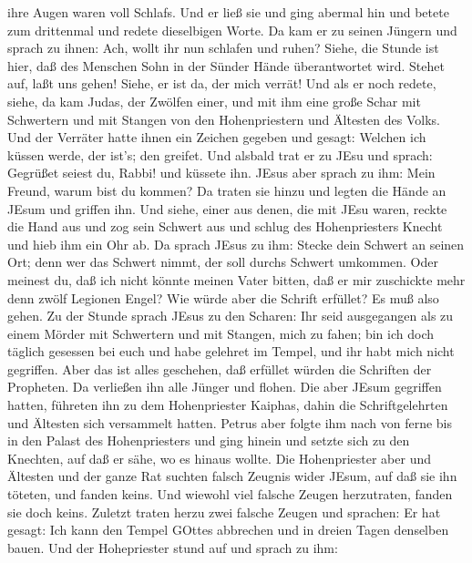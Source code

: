 ihre Augen waren voll Schlafs.  Und er ließ sie und ging
abermal hin und betete zum drittenmal und redete dieselbigen Worte.
 Da kam er zu seinen Jüngern und sprach zu ihnen: Ach,
wollt ihr nun schlafen und ruhen? Siehe, die Stunde ist hier, daß des
Menschen Sohn in der Sünder Hände überantwortet wird. 
Stehet auf, laßt uns gehen! Siehe, er ist da, der mich verrät!
 Und als er noch redete, siehe, da kam Judas, der Zwölfen
einer, und mit ihm eine große Schar mit Schwertern und mit Stangen von
den Hohenpriestern und Ältesten des Volks.  Und der
Verräter hatte ihnen ein Zeichen gegeben und gesagt: Welchen ich küssen
werde, der ist's; den greifet.  Und alsbald trat er zu JEsu
und sprach: Gegrüßet seiest du, Rabbi! und küssete ihn. 
JEsus aber sprach zu ihm: Mein Freund, warum bist du kommen? Da traten
sie hinzu und legten die Hände an JEsum und griffen ihn. 
Und siehe, einer aus denen, die mit JEsu waren, reckte die Hand aus und
zog sein Schwert aus und schlug des Hohenpriesters Knecht und hieb ihm
ein Ohr ab.  Da sprach JEsus zu ihm: Stecke dein Schwert an
seinen Ort; denn wer das Schwert nimmt, der soll durchs Schwert
umkommen.  Oder meinest du, daß ich nicht könnte meinen
Vater bitten, daß er mir zuschickte mehr denn zwölf Legionen Engel?
 Wie würde aber die Schrift erfüllet? Es muß also gehen.
 Zu der Stunde sprach JEsus zu den Scharen: Ihr seid
ausgegangen als zu einem Mörder mit Schwertern und mit Stangen, mich zu
fahen; bin ich doch täglich gesessen bei euch und habe gelehret im
Tempel, und ihr habt mich nicht gegriffen.  Aber das ist
alles geschehen, daß erfüllet würden die Schriften der Propheten. Da
verließen ihn alle Jünger und flohen.  Die aber JEsum
gegriffen hatten, führeten ihn zu dem Hohenpriester Kaiphas, dahin die
Schriftgelehrten und Ältesten sich versammelt hatten. 
Petrus aber folgte ihm nach von ferne bis in den Palast des
Hohenpriesters und ging hinein und setzte sich zu den Knechten, auf daß
er sähe, wo es hinaus wollte.  Die Hohenpriester aber und
Ältesten und der ganze Rat suchten falsch Zeugnis wider JEsum, auf daß
sie ihn töteten,  und fanden keins. Und wiewohl viel
falsche Zeugen herzutraten, fanden sie doch keins. Zuletzt traten herzu
zwei falsche Zeugen  und sprachen: Er hat gesagt: Ich kann
den Tempel GOttes abbrechen und in dreien Tagen denselben bauen.
 Und der Hohepriester stund auf und sprach zu ihm:
